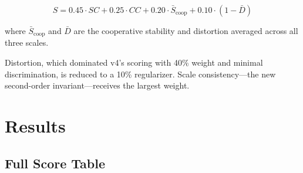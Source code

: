 \documentclass{../yalumba}
\begin{document}
\begin{equation}
  S = 0.45 \cdot SC + 0.25 \cdot CC + 0.20 \cdot \bar{S}_{\text{coop}}
    + 0.10 \cdot (1 - \bar{D})
  \label{eq:composite}
\end{equation}

where $\bar{S}_{\text{coop}}$ and $\bar{D}$ are the cooperative stability
and distortion averaged across all three scales.


Distortion, which dominated v4's scoring with 40\% weight and minimal
discrimination, is reduced to a 10\% regularizer.  Scale consistency---the
new second-order invariant---receives the largest weight.


\section{Results}
\label{sec:results}

\subsection{Full Score Table}
\end{document}
